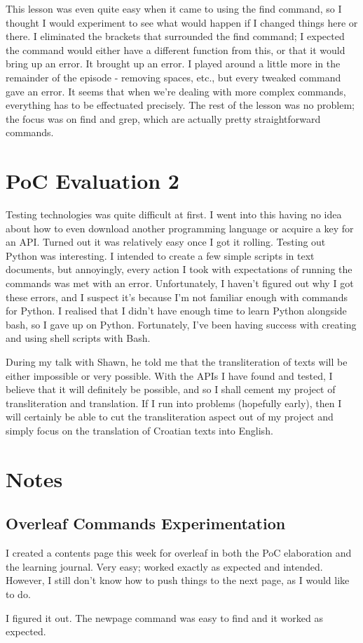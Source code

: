 \documentclass{article}
\begin{document}
This lesson was even quite easy when it came to using the find command, so I thought I would experiment to see what would happen if I changed things here or there. I eliminated the brackets that surrounded the find command; I expected the command would either have a different function from this, or that it would bring up an error. It brought up an error. I played around a little more in the remainder of the episode - removing spaces, etc., but every tweaked command gave an error. It seems that when we're dealing with more complex commands, everything has to be effectuated precisely. The rest of the lesson was no problem; the focus was on find and grep, which are actually pretty straightforward commands.

\section{PoC Evaluation 2}
Testing technologies was quite difficult at first. I went into this having no idea about how to even download another programming language or acquire a key for an API. Turned out it was relatively easy once I got it rolling. Testing out Python was interesting. I intended to create a few simple scripts in text documents, but annoyingly, every action I took with expectations of running the commands was met with an error. Unfortunately, I haven't figured out why I got these errors, and I suspect it's because I'm not familiar enough with commands for Python. I realised that I didn't have enough time to learn Python alongside bash, so I gave up on Python. Fortunately, I've been having success with creating and using shell scripts with Bash.

During my talk with Shawn, he told me that the transliteration of texts will be either impossible or very possible. With the APIs I have found and tested, I believe that it will definitely be possible, and so I shall cement my project of transliteration and translation. If I run into problems (hopefully early), then I will certainly be able to cut the transliteration aspect out of my project and simply focus on the translation of Croatian texts into English.

\section{Notes}
\subsection{Overleaf Commands Experimentation}
I created a contents page this week for overleaf in both the PoC elaboration and the learning journal. Very easy; worked exactly as expected and intended. However, I still don't know how to push things to the next page, as I would like to do.

I figured it out. The newpage command was easy to find and it worked as expected.
\end{document}
